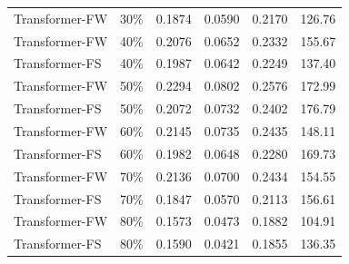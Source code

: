 \begin{longtable}{l c c c c c}
        Transformer-FW & 30\% & 0.1874 & 0.0590 & 0.2170 & 126.76 \\
        Transformer-FW & 40\% & 0.2076 & 0.0652 & 0.2332 & 155.67 \\
        Transformer-FS & 40\% & 0.1987 & 0.0642 & 0.2249 & 137.40 \\
        Transformer-FW & 50\% & 0.2294 & 0.0802 & 0.2576 & 172.99 \\
        Transformer-FS & 50\% & 0.2072 & 0.0732 & 0.2402 & 176.79 \\
        Transformer-FW & 60\% & 0.2145 & 0.0735 & 0.2435 & 148.11 \\
        Transformer-FS & 60\% & 0.1982 & 0.0648 & 0.2280 & 169.73 \\
        Transformer-FW & 70\% & 0.2136 & 0.0700 & 0.2434 & 154.55 \\
        Transformer-FS & 70\% & 0.1847 & 0.0570 & 0.2113 & 156.61 \\
        Transformer-FW & 80\% & 0.1573 & 0.0473 & 0.1882 & 104.91 \\
        Transformer-FS & 80\% & 0.1590 & 0.0421 & 0.1855 & 136.35 \\

\end{longtable}

